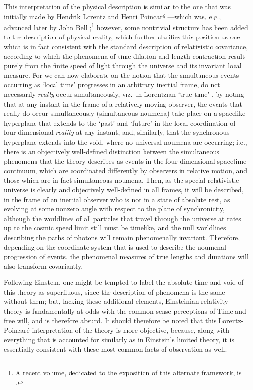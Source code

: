 This interpretation of the physical description is similar to the one that was initially made by Hendrik Lorentz \cite{Lorentz1904,Einstein1952} and Henri Poincar\'{e} \cite{Poincare1913}---which was, e.g., advanced later by John Bell \cite{Bell1976,Bell1987};\footnote{A recent volume, dedicated to the exposition of this alternate framework, is \cite{Craig2008}.} however, some nontrivial structure has been added to the description of physical reality, which further clarifies this position as one which is in fact consistent with the standard description of relativistic covariance, according to which the phenomena of time dilation and length contraction result purely from the finite speed of light through the universe and its invariant local measure. For we can now elaborate on the notion that the simultaneous events occurring as `local time' progresses in an arbitrary inertial frame, do not necessarily \textit{really} occur simultaneously, viz.~in Lorentzian `true time' \cite{Lorentz1904,Einstein1952}, by noting that at any instant in the frame of a relatively moving observer, the events that really do occur simultaneously (simultaneous noumena) take place on a spacelike hyperplane that extends to the `past' and `future' in the local coordination of four-dimensional \textit{reality} at any instant, and, similarly, that the synchronous hyperplane extends into the void, where no universal noumena are occurring; i.e., there is an objectively well-defined distinction between the simultaneous phenomena that the theory describes as events in the four-dimensional spacetime continuum, which are coordinated differently by observers in relative motion, and those which are in fact simultaneous noumena. Then, as the special relativistic universe is clearly and objectively well-defined in all frames, it will be described, in the frame of an inertial observer who is not in a state of absolute rest, as evolving at some nonzero angle with respect to the plane of synchronicity, although the worldlines of all particles that travel through the universe at rates up to the cosmic speed limit still must be timelike, and the null worldlines describing the paths of photons will remain phenomenally invariant. Therefore, depending on the coordinate system that is used to describe the noumenal progression of events, the phenomenal measures of true lengths and durations will also transform covariantly.

Following Einstein, one might be tempted to label the absolute time and void of this theory as superfluous, since the description of phenomena is the same without them; but, lacking these additional elements, Einsteinian relativity theory is fundamentally at-odds with the common sense perceptions of Time and free will, and is therefore absurd. It should therefore be noted that this Lorentz-Poincar\'{e} interpretation of the theory is more objective, because, along with everything that is accounted for similarly as in Einstein's limited theory, it is essentially consistent with these most common facts of observation as well.

